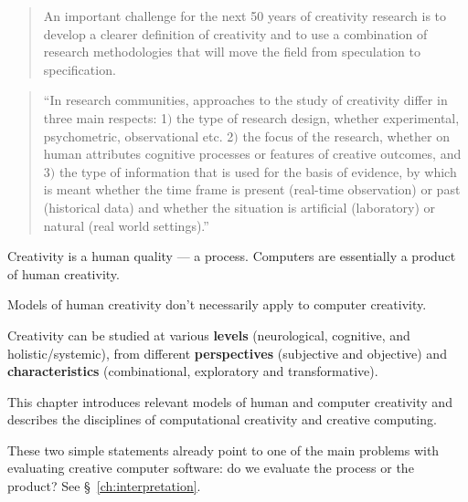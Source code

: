 \begin{quote}
  An important challenge for the next 50 years of creativity research is to develop a clearer definition of creativity and to use a combination of research methodologies that will move the field from speculation to specification. \citep[p.459]{Mayer1999}
\end{quote}

\begin{quote}
  ``In research communities, approaches to the study of creativity differ in three main respects: 1$)$ the type of research design, whether experimental, psychometric, observational etc. 2$)$ the focus of the research, whether on human attributes cognitive processes or features of creative outcomes, and 3$)$ the type of information that is used for the basis of evidence, by which is meant whether the time frame is present (real-time observation) or past (historical data) and whether the situation is artificial (laboratory) or natural (real world settings).'' \citep[p.3]{Candy2012}%
\end{quote}

Creativity is a human quality --- a process. Computers are essentially a product of human creativity.

Models of human creativity don't necessarily apply to computer creativity.

Creativity can be studied at various \textbf{levels} (neurological, cognitive, and holistic/systemic), from different \textbf{perspectives} (subjective and objective) and \textbf{characteristics} (combinational, exploratory and transformative).

This chapter introduces relevant models of human and computer creativity and describes the disciplines of computational creativity and creative computing.

\begin{draft}
  These two simple statements already point to one of the main problems with evaluating creative computer software: do we evaluate the process or the product? See §~\ref{ch:interpretation}.
\end{draft}


\clearpage

\vspace*{\fill}

